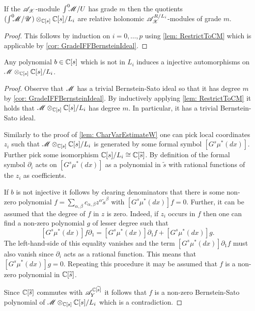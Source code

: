 \begin{lemma}\label{lem: QuotientsRelativeHolonomic}
  If the $\mathscr{A}_{\mathscr{X}}$-module $\int^0 \mkern -8mu\mathscr{M}/U$ has grade $m$ then the quotients $(\int^0 \mkern -8mu\mathscr{M}/\mathscr{U})\otimes_{\mathbb{C}[s]} \mathbb{C}[s]/L_{i}$ are relative holonomic $\mathscr{A}_{\mathscr{X}}^{R/L_i}$-modules of grade $m$.
\end{lemma}
\begin{proof}
  This follows by induction on $i=0,\ldots,p$ using \cref{lem: RestrictToCM} which is applicable by \cref{cor: GradeIFFBernsteinIdeal}.
\end{proof}
\begin{lemma}\label{lem: InjectiveEll}
  Any polynomial $b\in \mathbb{C}[s]$ which is not in $L_i$ induces a injective automorphisms on $\mathscr{M} \otimes_{\mathbb{C}[s]}\mathbb{C}[s]/L_i$.
\end{lemma}
\begin{proof}
  Observe that $\mathscr{M}$ has a trivial Bernstein-Sato ideal so that it has degree $m$ by \cref{cor: GradeIFFBernsteinIdeal}.
  By inductively applying \cref{lem: RestrictToCM} it holds that $\mathscr{M} \otimes_{\mathbb{C}[s]}\mathbb{C}[s]/L_i$ has degree $m$.
  In particular, it has a trivial Bernstein-Sato ideal.

  Similarly to the proof of \cref{lem: CharVarEstimateW} one can pick local coordinates $z_i$ such that $\mathscr{M} \otimes_{\mathbb{C}[s]}\mathbb{C}[s]/L_i$ is generated by some formal symbol $[G^s \mu^*(dx)]$.
  Further pick some isomorphism $\mathbb{C}[s]/L_i \cong \mathbb{C}[\widetilde{s}]$.
  By definition of the formal symbol $\partial_i$ acts on $[G^s \mu^*(dx)]$ as a polynomial in $\widetilde{s}$ with rational functions of the $z_i$ as coefficients.

  If $b$ is not injective it follows by clearing denominators that there is some non-zero polynomial $f = \sum_{\alpha,\beta} c_{\alpha,\beta} z^\alpha \widetilde{s}^\beta$ with $[G^s \mu^*(dx)] f = 0$.
  Further, it can be assumed that the degree of $f$ in $z$ is zero.
  Indeed, if $z_i$ occurs in $f$ then one can find a non-zero polynomial $g$ of lesser degree such that
  $$[G^s \mu^*(dx)] f\partial_1 = [G^s \mu^*(dx)]\partial_1 f + [G^s \mu^*(dx)] g.$$
  The left-hand-side of this equality vanishes and the term $[G^s \mu^*(dx)]\partial_1 f$ must also vanish since $\partial_i$ acts as a rational function.
  This means that $[G^s \mu^*(dx)] g = 0$.
  Repeating this procedure it may be assumed that $f$ is a non-zero polynomial in $\mathbb{C}[\widetilde{s}]$.

  Since $\mathbb{C}[\widetilde{s}]$ commutes with $\mathscr{A}_Y^{\mathbb{C}[\widetilde{s}]}$ it follows that $f$ is a non-zero Bernstein-Sato polynomial of $\mathscr{M} \otimes_{\mathbb{C}[s]}\mathbb{C}[s]/L_i$ which is a contradiction.
\end{proof}
